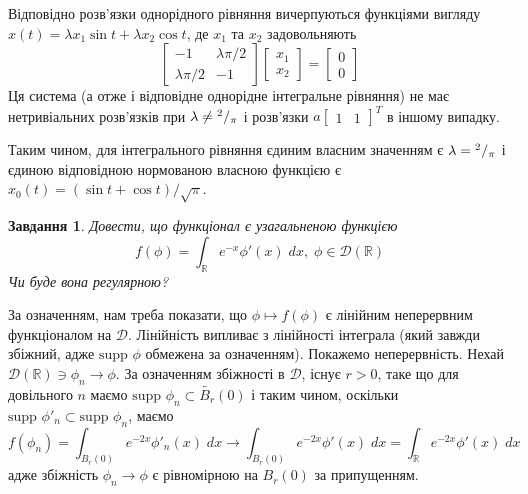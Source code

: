 \documentclass[10pt]{article}
\newtheorem{prob}{Завдання}
\newcommand{\dx}{\;dx}
\begin{document}
	Відповідно розв’язки однорідного рівняння вичерпуються функціями вигляду
	$x(t)=\lambda x_1\sin t+\lambda x_2\cos t$, де $x_1$ та $x_2$ задовольняють
	\[\begin{bmatrix}
		-1&\lambda\pi/2\\
		\lambda\pi/2&-1
	\end{bmatrix}
	\begin{bmatrix}x_1\\x_2\end{bmatrix}=\begin{bmatrix}0\\0\end{bmatrix}\]
	Ця система (а отже і відповідне однорідне інтегральне рівняння) не має нетривіальних розв’язків при 
	$\lambda\neq{^{2}/_{\pi}}$ і розв’язки $a\begin{bmatrix}1&1\end{bmatrix}^T$ в іншому випадку.

	Таким чином, для інтегрального рівняння єдиним власним значенням є $\lambda={^{2}/_{\pi}}$ і єдиною відповідною нормованою
	власною функцією є $x_0(t)=(\sin t+\cos t)/\sqrt{\pi}$.
\begin{prob}
	Довести, що функціонал є узагальненою функцією	\[f(\phi)=\int_{\mathbb{R}}e^{-x}\phi'(x)\dx,\;\phi\in\mathcal{D}(\mathbb{R})\]
	Чи буде вона регулярною?
\end{prob}
\newcommand{\supp}{\mbox{supp }}
За означенням, нам треба показати, що $\phi\mapsto f(\phi)$ є лінійним неперервним функціоналом на $\mathcal{D}$. Лінійність
випливає з лінійності інтеграла (який завжди збіжний, адже $\supp \phi$ обмежена за означенням). Покажемо неперервність.
Нехай $\mathcal{D}(\mathbb{R})\ni\phi_n\to\phi$. За означенням
збіжності в $\mathcal{D}$, існує $r>0$, таке що для довільного
$n$ маємо $\supp\phi_n\subset\widetilde{B_r}(0)$ і таким чином, оскільки $\supp\phi'_n\subset\supp\phi_n$, маємо
\[f(\phi_n)=\int_{B_r(0)}e^{-2x}\phi'_n(x)\dx\to\int_{B_r(0)}e^{-2x}\phi'(x)\dx=\int_{\mathbb{R}}e^{-2x}\phi'(x)\dx\]
адже збіжність $\phi_n\to\phi$ є рівномірною на $B_r(0)$ за припущенням.
\end{document}
